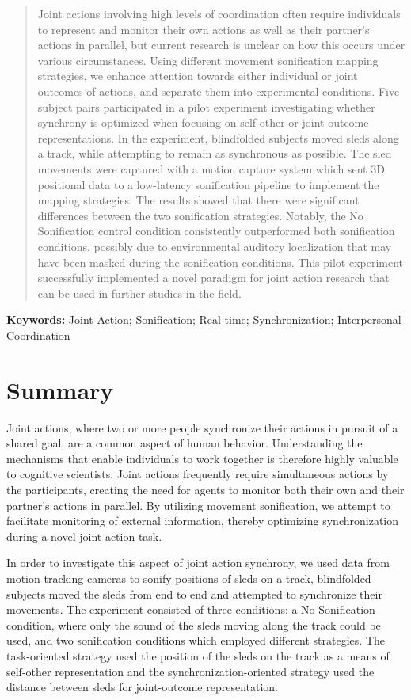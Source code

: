 \documentclass[10pt,a4paper,onecolumn]{article}
\begin{document}
    \begin{abstract}
  Joint actions involving high levels of coordination often require individuals to represent and monitor their own actions as well as their partner's actions in parallel, but current research is unclear on how this occurs under various circumstances. Using different movement sonification mapping strategies, we enhance attention towards either individual or joint outcomes of actions, and separate them into experimental conditions. Five subject pairs participated in a pilot experiment investigating whether synchrony is optimized when focusing on self-other or joint outcome representations. In the experiment, blindfolded subjects moved sleds along a track, while attempting to remain as synchronous as possible. The sled movements were captured with a motion capture system which sent 3D positional data to a low-latency sonification pipeline to implement the mapping strategies. The results showed that there were significant differences between the two sonification strategies. Notably, the No Sonification control condition consistently outperformed both sonification conditions, possibly due to environmental auditory localization that may have been masked during the sonification conditions. This pilot experiment successfully implemented a novel paradigm for joint action research that can be used in further studies in the field.
  \end{abstract}
  
    \bigbreak
  \textbf{Keywords:} {Joint Action; Sonification; Real-time; Synchronization; Interpersonal Coordination}
    

\restoregeometry
\clearpage
\section*{Summary}
Joint actions, where two or more people synchronize their actions in pursuit of a shared goal, are a common aspect of human behavior. Understanding the mechanisms that enable individuals to work together is therefore highly valuable to cognitive scientists. Joint actions frequently require simultaneous actions by the participants, creating the need for agents to monitor both their own and their partner's actions in parallel. By utilizing movement sonification, we attempt to facilitate monitoring of external information, thereby optimizing synchronization during a novel joint action task.

In order to investigate this aspect of joint action synchrony, we used data from motion tracking cameras to sonify positions of sleds on a track, blindfolded subjects moved the sleds from end to end and attempted to synchronize their movements. The experiment consisted of three conditions: a No Sonification condition, where only the sound of the sleds moving along the track could be used, and two sonification conditions which employed different strategies. The task-oriented strategy used the position of the sleds on the track as a means of self-other representation and the synchronization-oriented strategy used the distance between sleds for joint-outcome representation.
\end{document}
